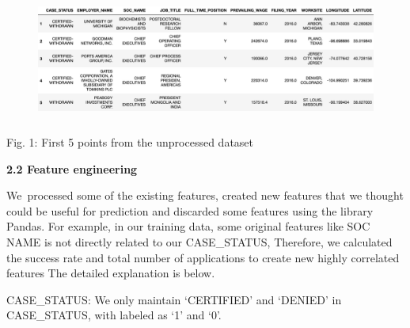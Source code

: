 \documentclass[12pt]{article}
\begin{document}

\begin{figure}[H]
	\begin{Center}
		\includegraphics[width=5.16in,height=1.62in]{./media/image1.jpg}
	\end{Center}
\end{figure}



\begin{justify}
 
\end{justify}\par

\begin{Center}
{\fontsize{8pt}{9.6pt}\selectfont Fig. 1: First 5 points from the unprocessed dataset\par}
\end{Center}\par


\vspace{\baselineskip}
\begin{justify}
\textbf{2.2 Feature engineering}
\end{justify}\par

\begin{justify}
We\ processed some of the existing features, created new features that we thought could be useful for prediction and discarded some features using the library Pandas. For example, in our training data, some original features like SOC NAME  is not directly related to our CASE\_STATUS, Therefore, we calculated the success rate and total number of applications to create new highly correlated features The detailed explanation is below.
\end{justify}\par

\begin{justify}
CASE\_STATUS: We only maintain ‘CERTIFIED’ and ‘DENIED’ in CASE\_STATUS, with labeled as ‘1’ and ‘0’.
\end{justify}\par
\end{document}
